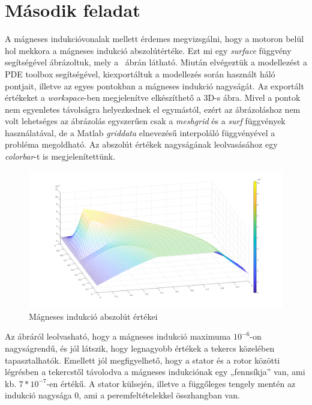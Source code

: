 \section{Második feladat}

A mágneses indukcióvonalak mellett érdemes megvizsgálni, hogy a motoron belül hol mekkora a mágneses indukció abszolútértéke. Ezt mi egy \textit{surface} függvény segítségével ábrázoltuk, mely a ~ábrán látható. Miután elvégeztük a modellezést a PDE toolbox segítségével, kiexportáltuk a modellezés során használt háló pontjait, illetve az egyes pontokban a mágneses indukció nagyságát. Az exportált értékeket a \textit{workspace}-ben megjelenítve elkészíthető a 3D-s ábra. Mivel a pontok nem egyenletes távolságra helyezkednek el egymástól, ezért az ábrázoláshoz nem volt lehetséges az ábrázolás egyszerűen csak a \textit{meshgrid} és a \textit{surf} függvények használatával, de a Matlab \textit{griddata} elnevezésű interpoláló függvényével a probléma megoldható. Az abszolút értékek nagyságának leolvasásához egy \textit{colorbar}-t is megjelenítettünk.

\begin{figure}[!h]
	\centering
	\includegraphics[width=150mm, keepaspectratio]{figures/terek/normal_eloszlas}
	\caption{Mágneses indukció abszolút értékei}
	\label{fig:normaleloszlas}
\end{figure}


Az ábráról leolvasható, hogy a mágneses indukció maximuma  $ 10^{-6} $-on nagyságrendű, és jól látszik, hogy legnagyobb értékek a tekercs közelében tapasztalhatók. Emellett jól megfigyelhető, hogy a stator és a rotor közötti légrésben a tekercstől távolodva a mágneses indukciónak egy „fennsíkja” van, ami kb.  $ 7*10^{-7} $-en értékű. A stator külsején, illetve a függőleges tengely mentén az indukció nagysága 0, ami a peremfeltételekkel összhangban van.
\newpage
